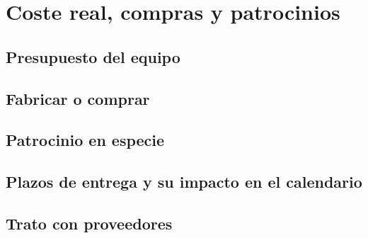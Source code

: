 \chapter{Coste real, compras y patrocinios}
\label{ch:coste_real_compras}

\begin{objetivos}
  \item {}
  \item {}
  \item {}
\end{objetivos}


\section{Presupuesto del equipo}
\label{sec:coste_real_compras:01}

\section{Fabricar o comprar}
\label{sec:coste_real_compras:02}

\section{Patrocinio en especie}
\label{sec:coste_real_compras:03}

\section{Plazos de entrega y su impacto en el calendario}
\label{sec:coste_real_compras:04}

\section{Trato con proveedores}
\label{sec:coste_real_compras:05}


